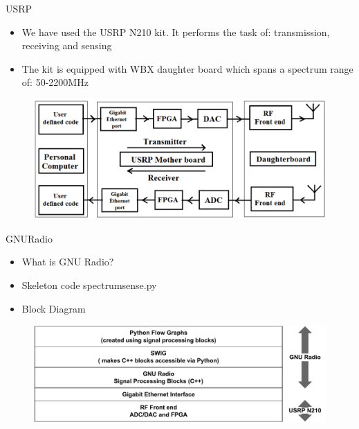 \documentclass{beamer}
\begin{document}
  \begin{frame}{USRP}
    \begin{itemize}
      \item We have used the USRP N210 kit. It performs the task of: transmission, receiving and sensing
      \item The kit is equipped with WBX daughter board which spans a spectrum range of: 50-2200MHz
    \end{itemize}
    \begin{figure}
      \centering
      \includegraphics[width=\linewidth]{img/usrpBlock}
    \end{figure}
  \end{frame}
  
  \begin{frame}{GNURadio}
    \begin{itemize}
        \item What is GNU Radio?
        \item Skeleton code spectrumsense.py
        \item Block Diagram
    \end{itemize}
    \begin{figure}
      \centering
      \includegraphics[width=\linewidth]{img/gnuradio_architecture}
    \end{figure}
  \end{frame}


    
\end{document}

